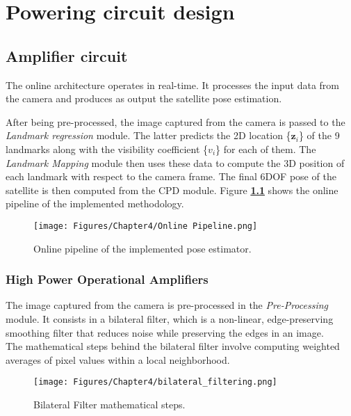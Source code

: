 
\chapter{Powering circuit design} %

\label{Chapter4} %


\section{Amplifier circuit}
The online architecture operates in real-time. It processes the input data from the camera and produces as output the satellite pose estimation.

After being pre-processed, the image captured from the camera is passed to the \textit{Landmark regression} module. The latter predicts the 2D location \{\(\textbf{z}_i\)\} of the 9 landmarks along with the visibility coefficient \{\(v_i\)\} for each of them. The \textit{Landmark Mapping} module then uses these data to compute the 3D position of each landmark with respect to the camera frame. The final 6DOF pose of the satellite is then computed from the CPD module. Figure \textbf{\ref{fig:Online Pipeline}} shows the online pipeline of the implemented methodology.
\begin{figure}[H]
    \centering
    \texttt{[image: Figures/Chapter4/Online Pipeline.png]}
    \caption[Online pipeline of the implemented pose estimator.]{Online pipeline of the implemented pose estimator.}
    \label{fig:Online Pipeline}
\end{figure}


\subsection{High Power Operational Amplifiers}
\label{Chapter4/Pre-Processing}
The image captured from the camera is pre-processed in the \textit{Pre-Processing} module. It consists in a bilateral filter, which is a non-linear, edge-preserving smoothing filter that reduces noise while preserving the edges in an image.\\
The mathematical steps behind the bilateral filter involve computing weighted averages of pixel values within a local neighborhood. 
\begin{figure}[th]
    \centering
    \texttt{[image: Figures/Chapter4/bilateral\_filtering.png]}
    \caption[Bilateral Filter.]{Bilateral Filter mathematical steps.}
    \label{fig:Bilateral Filter}
\end{figure}

